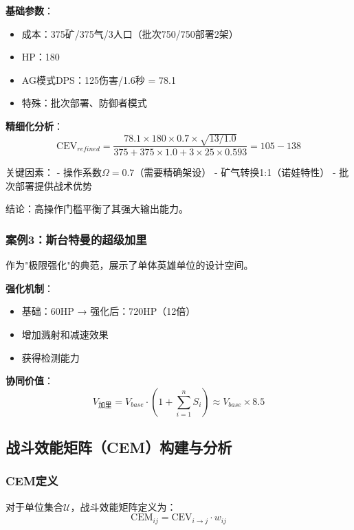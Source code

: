 \documentclass[a4paper,12pt]{article}
\begin{document}
\textbf{基础参数}：
\begin{itemize}
\item 成本：375矿/375气/3人口（批次750/750部署2架）
\item HP：180
\item AG模式DPS：125伤害/1.6秒 = 78.1
\item 特殊：批次部署、防御者模式
\end{itemize}

\textbf{精细化分析}：
\begin{equation}
\text{CEV}_{refined} = \frac{78.1 \times 180 \times 0.7 \times \sqrt{13/1.0}}{375 + 375 \times 1.0 + 3 \times 25 \times 0.593} = 105-138
\end{equation}

关键因素：
- 操作系数$\Omega = 0.7$（需要精确架设）
- 矿气转换1:1（诺娃特性）
- 批次部署提供战术优势

结论：高操作门槛平衡了其强大输出能力。

\subsubsection{案例3：斯台特曼的超级加里}
作为"极限强化"的典范，展示了单体英雄单位的设计空间。

\textbf{强化机制}：
\begin{itemize}
\item 基础：60HP → 强化后：720HP（12倍）
\item 增加溅射和减速效果
\item 获得检测能力
\end{itemize}

\textbf{协同价值}：
\begin{equation}
V_{加里} = V_{base} \cdot (1 + \sum_{i=1}^{n} S_i) \approx V_{base} \times 8.5
\end{equation}

\subsection{战斗效能矩阵（CEM）构建与分析}

\subsubsection{CEM定义}
对于单位集合$\mathcal{U}$，战斗效能矩阵定义为：
\begin{equation}
\text{CEM}_{ij} = \text{CEV}_{i \rightarrow j} \cdot w_{ij}
\end{equation}
\end{document}
